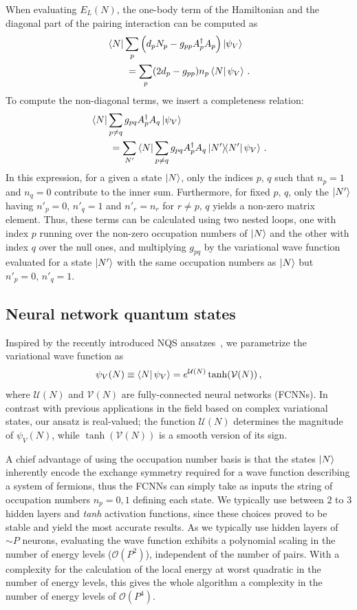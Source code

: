 \documentclass[aps,pre,floatfix,showpacs,twocolumn, preprintnumbers]{revtex4-1}
\begin{document}
When evaluating $E_L(N)$, the one-body term of the Hamiltonian and the diagonal part of the pairing interaction can be computed as
\begin{align}
&\bra{N}\sum_p\Big(d_pN_p - g_{pp}A^\dag_pA_p\Big)\ket{\psi_V} \nonumber\\
&\qquad =\sum_p(2d_p-g_{p p})n_p \bra{N}\psi_V\rangle\ .
\end{align}
To compute the non-diagonal terms, we insert a completeness relation:
\begin{align}
    &\bra{N}\sum_{p\neq q}g_{pq}A^\dag_pA_q \ket{\psi_V}\nonumber\\
    & \qquad = \sum_{N'}\bra{N}\sum_{p\neq q}g_{pq}A^\dag_pA_q\ketbra{N'}\psi_V\rangle\ .
\end{align}
In this expression, for a given a state $\ket{N}$, only the indices $p,\,q$ such that $n_p=1$ and $n_q=0$ contribute to the inner sum. Furthermore, for fixed $p,\,q$, only the $\ket{N'}$ having $n'_p=0,\,n'_q=1$ and $n'_r=n_r$ for $r\neq p,\,q$ yields a non-zero matrix element. Thus, these terms can be calculated using two nested loops, one with index $p$ running over the non-zero occupation numbers of $\ket{N}$ and the other with index $q$ over the null ones, and multiplying $g_{pq}$ by the variational wave function evaluated for a state $\ket{N'}$ with the same occupation numbers as $\ket{N}$ but $n'_p=0,\,n'_q=1$.

\subsection{Neural network quantum states}
Inspired by the recently introduced NQS ansatzes~\cite{Gnech:2021wfn,Lovato:2022tjh}, we parametrize the variational wave function as
\begin{equation}
    \psi_V(N)\equiv \bra{N}\psi_V\rangle = e^{\mathcal{U}(N)}\tanh(\mathcal{V}(N))\, ,
\end{equation}
where $\mathcal{U}(N)$ and $\mathcal{V}(N)$ are fully-connected neural networks (FCNNs). In contrast with previous applications in the field based on complex variational states, our ansatz is real-valued; the function $\mathcal{U}(N)$ determines the magnitude of $\psi_V(N)$, while $\tanh(\mathcal{V}(N))$ is a smooth version of its sign. 

A chief advantage of using the occupation number basis is that the states $\ket{N}$ inherently encode the exchange symmetry required for a wave function describing a system of fermions, thus the FCNNs can simply take as inputs the string of occupation numbers $n_p=0,1$ defining each state. We typically use between $2$ to $3$ hidden layers and \textit{tanh} activation functions, since these choices proved to be stable and yield the most accurate results. As we typically use hidden layers of $\sim P$ neurons, evaluating the wave function exhibits a polynomial scaling in the number of energy levels ($\mathcal{O}(P^2)$), independent of the number of pairs. With a complexity for the calculation of the local energy at worst quadratic in the number of energy levels, this gives the whole algorithm a complexity in the number of energy levels of $\mathcal{O}(P^4)$.
\end{document}

